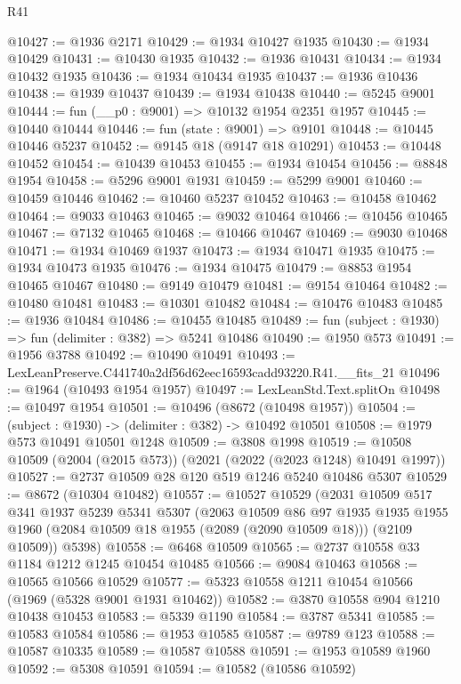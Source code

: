 \begin{lexlean}{R41}
\begin{coremodule}
@10427 := @1936 @2171
@10429 := @1934 @10427 @1935
@10430 := @1934 @10429
@10431 := @10430 @1935
@10432 := @1936 @10431
@10434 := @1934 @10432 @1935
@10436 := @1934 @10434 @1935
@10437 := @1936 @10436
@10438 := @1939 @10437
@10439 := @1934 @10438
@10440 := @5245 @9001
@10444 := fun (__p0 : @9001) => @10132 @1954 @2351 @1957
@10445 := @10440 @10444
@10446 := fun (state : @9001) => @9101
@10448 := @10445 @10446 @5237
@10452 := @9145 @18 (@9147 @18 @10291)
@10453 := @10448 @10452
@10454 := @10439 @10453
@10455 := @1934 @10454
@10456 := @8848 @1954
@10458 := @5296 @9001 @1931
@10459 := @5299 @9001
@10460 := @10459 @10446
@10462 := @10460 @5237 @10452
@10463 := @10458 @10462
@10464 := @9033 @10463
@10465 := @9032 @10464
@10466 := @10456 @10465
@10467 := @7132 @10465
@10468 := @10466 @10467
@10469 := @9030 @10468
@10471 := @1934 @10469 @1937
@10473 := @1934 @10471 @1935
@10475 := @1934 @10473 @1935
@10476 := @1934 @10475
@10479 := @8853 @1954 @10465 @10467
@10480 := @9149 @10479
@10481 := @9154 @10464
@10482 := @10480 @10481
@10483 := @10301 @10482
@10484 := @10476 @10483
@10485 := @1936 @10484
@10486 := @10455 @10485
@10489 := fun (subject : @1930) => fun (delimiter : @382) => @5241 @10486
@10490 := @1950 @573
@10491 := @1956 @3788
@10492 := @10490 @10491
@10493 := LexLeanPreserve.C441740a2df56d62eec16593cadd93220.R41.__fits_21
@10496 := @1964 (@10493 @1954 @1957)
@10497 := LexLeanStd.Text.splitOn
@10498 := @10497 @1954
@10501 := @10496 (@8672 (@10498 @1957))
@10504 := (subject : @1930) -> (delimiter : @382) -> @10492 @10501
@10508 := @1979 @573 @10491 @10501 @1248
@10509 := @3808 @1998
@10519 := @10508 @10509 (@2004 (@2015 @573)) (@2021 (@2022 (@2023 @1248) @10491 @1997))
@10527 := @2737 @10509 @28 @120 @519 @1246 @5240 @10486 @5307
@10529 := @8672 (@10304 @10482)
@10557 := @10527
    @10529
    (@2031
      @10509
      @517
      @341
      @1937
      @5239
      @5341
      @5307
      (@2063
        @10509
        @86
        @97
        @1935
        @1935
        @1955
        @1960
        (@2084 @10509 @18 @1955 (@2089 (@2090 @10509 @18)))
        (@2109 @10509))
      @5398)
@10558 := @6468 @10509
@10565 := @2737 @10558 @33 @1184 @1212 @1245 @10454 @10485
@10566 := @9084 @10463
@10568 := @10565 @10566 @10529
@10577 := @5323 @10558 @1211 @10454 @10566 (@1969 (@5328 @9001 @1931 @10462))
@10582 := @3870 @10558 @904 @1210 @10438 @10453
@10583 := @5339 @1190
@10584 := @3787 @5341
@10585 := @10583 @10584
@10586 := @1953 @10585
@10587 := @9789 @123
@10588 := @10587 @10335
@10589 := @10587 @10588
@10591 := @1953 @10589 @1960
@10592 := @5308 @10591
@10594 := @10582 (@10586 @10592)

\end{coremodule}
\end{lexlean}

